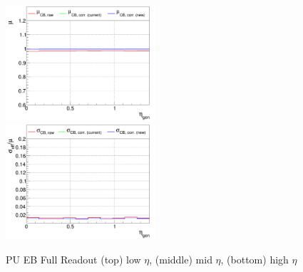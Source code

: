 \begin{figure}
\includegraphics[width=0.495\textwidth]{./plots_pdf/ECAL_plots/plotsPU/EB/FULL/pdf/GENETA/EBFULL_GENETA_0100_0300_MuOverBins.pdf}
\includegraphics[width=0.495\textwidth]{./plots_pdf/ECAL_plots/plotsPU/EB/FULL/pdf/GENETA/EBFULL_GENETA_0100_0300_EffSigmaOverBins.pdf}

\caption [Energy response of PF ECAL cluster vs $\eta$ for PU EB Full readout senario]{PU EB Full Readout (top) low $\eta$, (middle) mid $\eta$, (bottom) high $\eta$}
\label{fig:PU_EBFULL_eta}
\end{figure}








